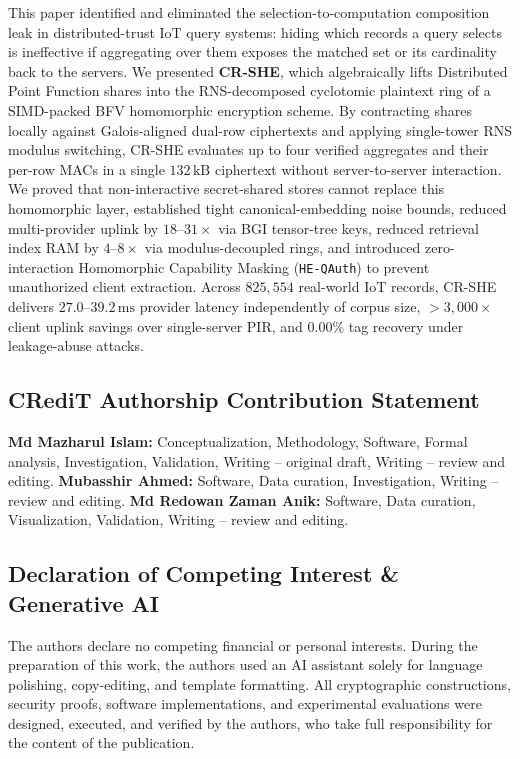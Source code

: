 \documentclass[11pt,a4paper]{article}
\begin{document}
This paper identified and eliminated the selection-to-computation composition leak in distributed-trust IoT query systems: hiding which records a query selects is ineffective if aggregating over them exposes the matched set or its cardinality back to the servers. We presented \textbf{CR-SHE}, which algebraically lifts Distributed Point Function shares into the RNS-decomposed cyclotomic plaintext ring of a SIMD-packed BFV homomorphic encryption scheme. By contracting shares locally against Galois-aligned dual-row ciphertexts and applying single-tower RNS modulus switching, CR-SHE evaluates up to four verified aggregates and their per-row MACs in a single $132\,\text{kB}$ ciphertext without server-to-server interaction. We proved that non-interactive secret-shared stores cannot replace this homomorphic layer, established tight canonical-embedding noise bounds, reduced multi-provider uplink by $18\text{--}31\times$ via BGI tensor-tree keys, reduced retrieval index RAM by $4\text{--}8\times$ via modulus-decoupled rings, and introduced zero-interaction Homomorphic Capability Masking (\texttt{HE-QAuth}) to prevent unauthorized client extraction. Across $825{,}554$ real-world IoT records, CR-SHE delivers $27.0\text{--}39.2\,\text{ms}$ provider latency independently of corpus size, $>3{,}000\times$ client uplink savings over single-server PIR, and $0.00\%$ tag recovery under leakage-abuse attacks.

\subsection*{CRediT Authorship Contribution Statement}
\textbf{Md Mazharul Islam:} Conceptualization, Methodology, Software, Formal analysis, Investigation, Validation, Writing -- original draft, Writing -- review and editing. \textbf{Mubasshir Ahmed:} Software, Data curation, Investigation, Writing -- review and editing. \textbf{Md Redowan Zaman Anik:} Software, Data curation, Visualization, Validation, Writing -- review and editing.

\subsection*{Declaration of Competing Interest \& Generative AI}
The authors declare no competing financial or personal interests. During the preparation of this work, the authors used an AI assistant solely for language polishing, copy-editing, and template formatting. All cryptographic constructions, security proofs, software implementations, and experimental evaluations were designed, executed, and verified by the authors, who take full responsibility for the content of the publication.
\end{document}
